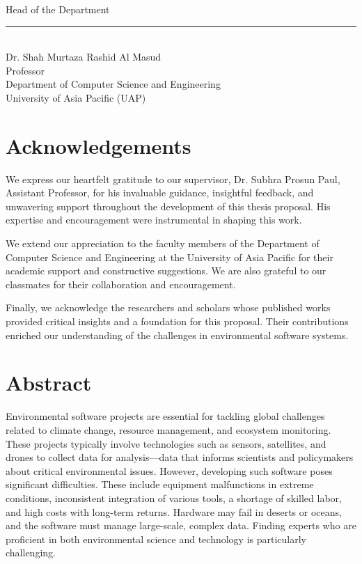 \documentclass[12pt, a4paper]{article} %
\begin{document}
\vspace{3em}
Head of the Department \\
\rule{0.5\textwidth}{0.4pt} \\
Dr. Shah Murtaza Rashid Al Masud \\
Professor \\
Department of Computer Science and Engineering \\
University of Asia Pacific (UAP)

\clearpage
\section*{Acknowledgements}
We express our heartfelt gratitude to our supervisor, Dr. Subhra Prosun Paul, Assistant Professor, for his invaluable guidance, insightful feedback, and unwavering support throughout the development of this thesis proposal. His expertise and encouragement were instrumental in shaping this work.

We extend our appreciation to the faculty members of the Department of Computer Science and Engineering at the University of Asia Pacific for their academic support and constructive suggestions. We are also grateful to our classmates for their collaboration and encouragement.

Finally, we acknowledge the researchers and scholars whose published works provided critical insights and a foundation for this proposal. Their contributions enriched our understanding of the challenges in environmental software systems.

\clearpage
\section*{Abstract}
Environmental software projects are essential for tackling global challenges related to climate change, resource management, and ecosystem monitoring. These projects typically involve technologies such as sensors, satellites, and drones to collect data for analysis—data that informs scientists and policymakers about critical environmental issues. However, developing such software poses significant difficulties. These include equipment malfunctions in extreme conditions, inconsistent integration of various tools, a shortage of skilled labor, and high costs with long-term returns. Hardware may fail in deserts or oceans, and the software must manage large-scale, complex data. Finding experts who are proficient in both environmental science and technology is particularly challenging.
\end{document}
